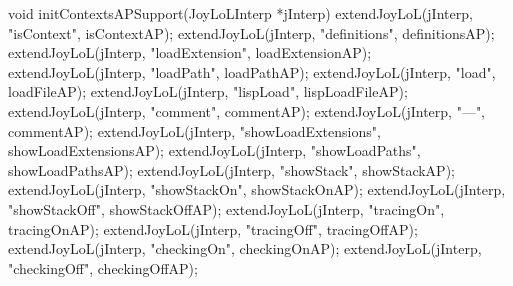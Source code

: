 \startCCode
void initContextsAPSupport(JoyLoLInterp *jInterp) {
  extendJoyLoL(jInterp, "isContext",           isContextAP);
  extendJoyLoL(jInterp, "definitions",         definitionsAP);
  extendJoyLoL(jInterp, "loadExtension",       loadExtensionAP);
  extendJoyLoL(jInterp, "loadPath",            loadPathAP);
  extendJoyLoL(jInterp, "load",                loadFileAP);
  extendJoyLoL(jInterp, "lispLoad",            lispLoadFileAP);
  extendJoyLoL(jInterp, "comment",             commentAP);
  extendJoyLoL(jInterp, "---",                 commentAP);
  extendJoyLoL(jInterp, "showLoadExtensions",  showLoadExtensionsAP);
  extendJoyLoL(jInterp, "showLoadPaths",       showLoadPathsAP);
  extendJoyLoL(jInterp, "showStack",           showStackAP);
  extendJoyLoL(jInterp, "showStackOn",         showStackOnAP);
  extendJoyLoL(jInterp, "showStackOff",        showStackOffAP);
  extendJoyLoL(jInterp, "tracingOn",           tracingOnAP);
  extendJoyLoL(jInterp, "tracingOff",          tracingOffAP);
  extendJoyLoL(jInterp, "checkingOn",          checkingOnAP);
  extendJoyLoL(jInterp, "checkingOff",         checkingOffAP);
}
\stopCCode